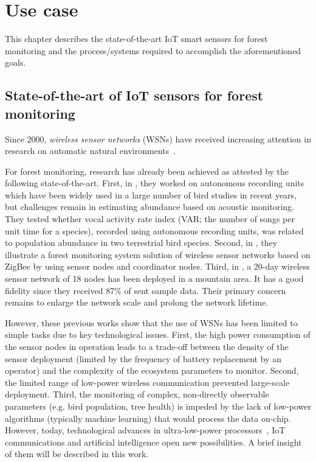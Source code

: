 \documentclass{EPL-master-thesis-covers-EN}
\begin{document}
\chapter{Use case}

This chapter describes the state-of-the-art IoT smart sensors for forest monitoring and the process/systems required to accomplish the aforementioned goals.

\section{State-of-the-art of IoT sensors for forest monitoring}

Since 2000, \textit{wireless sensor networks} (WSNs) have received increasing attention in research on automatic natural environments~\cite{Akyildiz}. 

For forest monitoring, research has already been achieved as attested by the following state-of-the-art. First, in \cite{Granados}, they worked on autonomous recording units which have been widely used in a large number of bird studies in recent years, but challenges remain in estimating abundance based on acoustic monitoring. They tested whether vocal activity rate index (VAR; the number of songs per unit time for a species), recorded using autonomous recording units, was related to population abundance in two terrestrial bird species. Second, in \cite{Huanqi}, they illustrate a forest monitoring system solution of wireless sensor networks based on ZigBee by using sensor nodes and coordinator nodes. Third, in \cite{Jiang}, a 20-day wireless sensor network of 18 nodes has been deployed in a mountain area. It has a good fidelity since they received 87\% of sent sample data. Their primary concern remains to enlarge the network scale and prolong the network lifetime.

However, these previous works show that the use of WSNs has been limited to simple tasks due to key technological issues. First, the high power consumption of the sensor nodes in operation leads to a trade-off between the density of the sensor deployment (limited by the frequency of battery replacement by an operator) and the complexity of the ecosystem parameters to monitor. Second, the limited range of low-power wireless communication prevented large-scale deployment. Third, the monitoring of complex, non-directly observable parameters (e.g. bird population, tree health) is impeded by the lack of low-power algorithms (typically machine learning) that would process the data on-chip. However, today, technological advances in ultra-low-power processors~\cite{8662293}, IoT communications and artificial intelligence open new possibilities. A brief insight of them will be described in this work.
\end{document}
